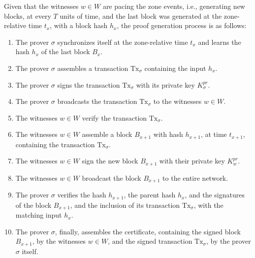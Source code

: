 Given that the witnesses $w \in W$ are pacing the zone events, i.e., generating new blocks, at every $T$ units of time, and the last block was generated at the zone-relative time $t_x$, with a block hash $h_x$, the proof generation process is as follows:

\begin{enumerate}
    \item The prover $\sigma$ synchronizes itself at the zone-relative time $t_x$ and learns the hash  $h_x$ of the last block $B_{x}$.
    \item The prover $\sigma$ assembles a transaction $\text{Tx}_\sigma$ containing the input $h_x$.
    \item The prover $\sigma$ signs the transaction $\text{Tx}_\sigma$ with its private key $K^{pr}_\sigma$.
    \item The prover $\sigma$ broadcasts the transaction $\text{Tx}_\sigma$ to the witnesses $w \in W$.
    \item The witnesses $w \in W$ verify the transaction $\text{Tx}_\sigma$.
    \item The witnesses $w \in W$ assemble a block $B_{x+1}$ with hash $h_{x+1}$, at time $t_{x+1}$, containing the transaction $\text{Tx}_\sigma$.
    \item The witnesses $w \in W$ sign the new block $B_{x+1}$ with their private key $K^{pr}_w$.
    \item The witnesses $w \in W$ broadcast the block $B_{x+1}$ to the entire network.
    \item The prover $\sigma$ verifies the hash $h_{x+1}$, the parent hash $h_{x}$, and the signatures of the block $B_{x+1}$, and the inclusion of its transaction $\text{Tx}_\sigma$, with the matching input $h_{x}$.
    \item The prover $\sigma$, finally, assembles the \pol{} certificate, containing the signed block $B_{x+1}$, by the witnesses $w \in W$, and the signed transaction $\text{Tx}_\sigma$, by the prover $\sigma$ itself.
\end{enumerate}


